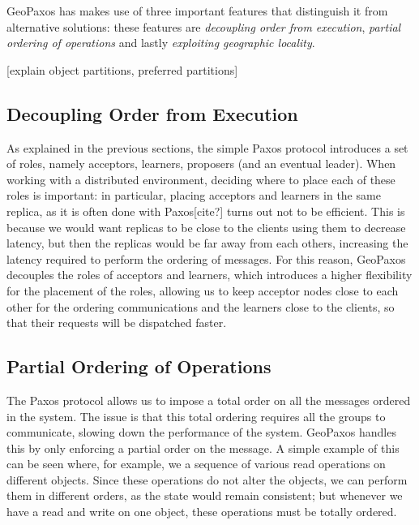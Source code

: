GeoPaxos has makes use of three important features that distinguish it from alternative solutions: these features are \emph{decoupling order from execution}, \emph{partial ordering of operations} and lastly \emph{exploiting geographic locality}.

[explain object partitions, preferred partitions]

\subsection{Decoupling Order from Execution}
As explained in the previous sections, the simple Paxos protocol introduces a set of roles, namely acceptors, learners, proposers (and an eventual leader). When working with a distributed environment, deciding where to place each of these roles is important: in particular, placing acceptors and learners in the same replica, as it is often done with Paxos[cite?] turns out not to be efficient. This is because we would want replicas to be close to the clients using them to decrease latency, but then the replicas would be far away from each others, increasing the latency required to perform the ordering of messages. For this reason, GeoPaxos decouples the roles of acceptors and learners, which introduces a higher flexibility for the placement of the roles, allowing us to keep acceptor nodes close to each other for the ordering communications and the learners close to the clients, so that their requests will be dispatched faster.
\subsection{Partial Ordering of Operations}
The Paxos protocol allows us to impose a total order on all the messages ordered in the system. The issue is that this total ordering requires all the groups to communicate, slowing down the performance of the system. GeoPaxos handles this by only enforcing a partial order on the message.
A simple example of this can be seen where, for example, we a sequence of various read operations on different objects. Since these operations do not alter the objects, we can perform them in different orders, as the state would remain consistent; but whenever we have a read and write on one object, these operations must be totally ordered.

